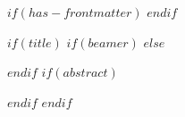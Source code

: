 
$if(has-frontmatter)$
  \frontmatter
$endif$

$if(title)$
  $if(beamer)$
    \frame{\titlepage}
  $else$
    \maketitle
  $endif$
  $if(abstract)$
    \begin{abstract}
      $abstract$
    \end{abstract}
  $endif$
$endif$
